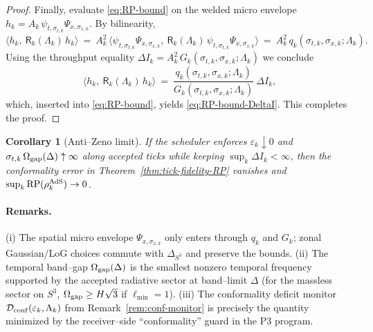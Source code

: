 \documentclass[10pt]{article}
\theoremstyle{definition}
\theoremstyle{plain}
\newtheorem{corollary}{Corollary}[section]
\begin{document}
\begin{proof}
Finally, evaluate \eqref{eq:RP-bound} on the welded micro envelope $h_k=A_k\,\psi_{t,\sigma_{t,k}}\Psi_{x,\sigma_{x,k}}$. By bilinearity,
\[
\big\langle h_k,\ \mathsf R_k(\Lambda_k)\,h_k\big\rangle\ =\ A_k^2\,\big\langle \psi_{t,\sigma_{t,k}}\Psi_{x,\sigma_{x,k}},\ \mathsf R_k(\Lambda_k)\,\psi_{t,\sigma_{t,k}}\Psi_{x,\sigma_{x,k}}\big\rangle\ =\ A_k^2\,q_k(\sigma_{t,k},\sigma_{x,k};\Lambda_k).
\]
Using the throughput equality $\Delta I_k=A_k^2\,G_k(\sigma_{t,k},\sigma_{x,k};\Lambda_k)$ we conclude
\[
\big\langle h_k,\ \mathsf R_k(\Lambda_k)\,h_k\big\rangle\ =\ \frac{q_k(\sigma_{t,k},\sigma_{x,k};\Lambda_k)}{G_k(\sigma_{t,k},\sigma_{x,k};\Lambda_k)}\ \Delta I_k,
\]
which, inserted into \eqref{eq:RP-bound}, yields \eqref{eq:RP-bound-DeltaI}. This completes the proof.
\end{proof}


\begin{corollary}[Anti–Zeno limit]
\label{cor:anti-zeno}
If the scheduler enforces $\varepsilon_k\downarrow 0$ and $\sigma_{t,k}\,\Omega_{\rm gap}(\Delta)\uparrow\infty$ along accepted ticks while keeping $\sup_k \Delta I_k<\infty$, then the conformality error in Theorem~\ref{thm:tick-fidelity-RP} vanishes and $\sup_k \mathrm{RP}(\rho_{k}^{\rm AdS})\to 0$.
\end{corollary}

\paragraph{Remarks.}\label{par:uom-main-244}
(i) The spatial micro envelope $\Psi_{x,\sigma_{x,k}}$ only enters through $q_k$ and $G_k$; zonal Gaussian/LoG choices commute with $\Delta_{S^3}$ and preserve the bounds. (ii) The temporal band–gap $\Omega_{\rm gap}(\Delta)$ is the smallest nonzero temporal frequency supported by the accepted radiative sector at band–limit $\Delta$ (for the massless sector on $S^3$, $\Omega_{\rm gap}\ge H\sqrt{3}$ if $\ell_{\min}=1$). (iii) The conformality deficit monitor $\mathcal D_{\rm conf}(\varepsilon_k,\Lambda_k)$ from Remark~\ref{rem:conf-monitor} is precisely the quantity minimized by the receiver–side “conformality” guard in the P3 program.
\end{document}

